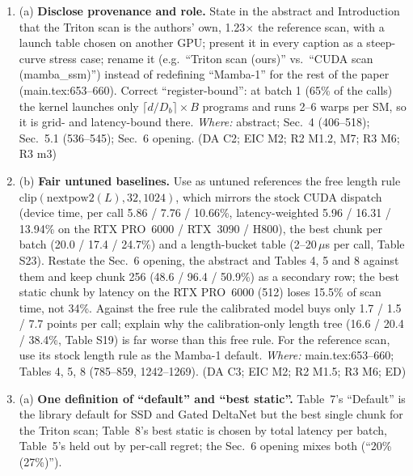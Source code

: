 \documentclass[11pt]{article}
\begin{document}
\begin{enumerate}[label=M2\alph*.]
  \item (a) \textbf{Disclose provenance and role.} State in the abstract and
        Introduction that the Triton scan is the authors' own, 1.23$\times$
        the reference scan, with a launch table chosen on another GPU; present
        it in every caption as a steep-curve stress case; rename it (e.g.\
        ``Triton scan (ours)'' vs.\ ``CUDA scan (mamba\_ssm)'') instead of
        redefining ``Mamba-1'' for the rest of the paper (main.tex:653--660).
        Correct ``register-bound'': at batch 1 (65\% of the calls) the kernel
        launches only $\lceil d/D_b\rceil\times B$ programs and runs 2--6 warps
        per SM, so it is grid- and latency-bound there. \emph{Where:}
        abstract; Sec.~4 (406--518); Sec.~5.1 (536--545); Sec.~6 opening.
        (DA C2; EIC M2; R2 M1.2, M7; R3 M6; R3 m3)
  \item (b) \textbf{Fair untuned baselines.} Use as untuned references the
        free length rule $\mathrm{clip}(\mathrm{nextpow2}(L),32,1024)$, which
        mirrors the stock CUDA dispatch (device time, per call 5.86 / 7.76 /
        10.66\%, latency-weighted 5.96 / 16.31 / 13.94\% on the RTX PRO~6000 /
        RTX~3090 / H800), the best chunk per batch (20.0 / 17.4 / 24.7\%) and
        a length-bucket table (2--20\,$\mu$s per call, Table S23). Restate the
        Sec.~6 opening, the abstract and Tables 4, 5 and 8 against them and
        keep chunk 256 (48.6 / 96.4 / 50.9\%) as a secondary row; the best
        static chunk by latency on the RTX PRO~6000 (512) loses 15.5\% of scan
        time, not 34\%. Against the free rule the calibrated model buys only
        1.7 / 1.5 / 7.7 points per call; explain why the calibration-only
        length tree (16.6 / 20.4 / 38.4\%, Table S19) is far worse than this
        free rule. For the reference scan, use its stock length rule as the
        Mamba-1 default. \emph{Where:} main.tex:653--660; Tables 4, 5, 8
        (785--859, 1242--1269). (DA C3; EIC M2; R2 M1.5; R3 M6; ED)
  \item (a) \textbf{One definition of ``default'' and ``best static''.}
        Table~7's ``Default'' is the library default for SSD and Gated
        DeltaNet but the best single chunk for the Triton scan; Table~8's best
        static is chosen by total latency per batch, Table~5's held out by
        per-call regret; the Sec.~6 opening mixes both (``20\% (27\%)'').

\end{enumerate}
\end{document}
